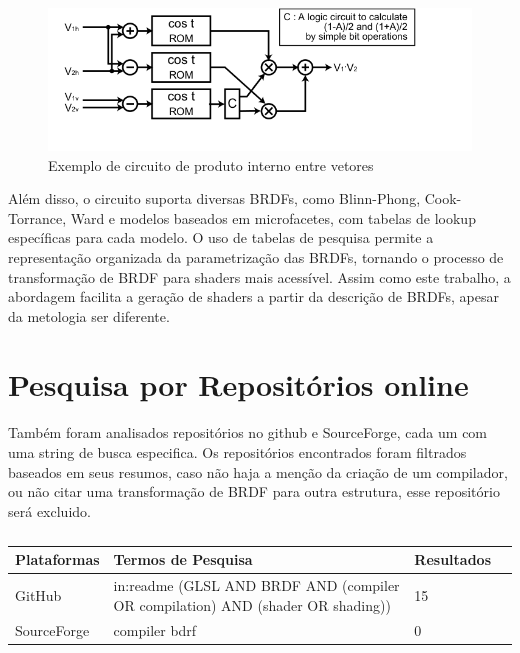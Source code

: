 \documentclass[english, 
               brazil, 
               bsc] %
               {dcomp-abntex2}
\begin{document}
\begin{figure}[H]
	\caption{\label{fig_grafico} Exemplo de circuito de produto interno entre vetores}
	\begin{center}
	    \includegraphics[scale=0.9]{./Imagens/rom-cos-lookup-table.png}
	\end{center}
\end{figure}


Além disso, o circuito suporta diversas BRDFs, como Blinn-Phong, Cook-Torrance, Ward e modelos baseados em microfacetes, com tabelas de lookup específicas para cada modelo. O uso de tabelas de pesquisa permite a representação organizada da parametrização das BRDFs, tornando o processo de transformação de BRDF para shaders mais acessível. Assim como este trabalho, a abordagem facilita a geração de shaders a partir da descrição de BRDFs, apesar da metologia ser diferente.

\section{Pesquisa por Repositórios online}
Também foram analisados repositórios no github e SourceForge, cada um com uma string de busca especifica. Os repositórios encontrados foram filtrados baseados em seus resumos, caso não haja a menção da criação de um compilador, ou não citar uma transformação de BRDF para outra estrutura, esse repositório será excluido.


\begin{table}[H]
\ABNTEXfontereduzida
\caption[bases]{}
\label{tab-bases}
\begin{tabular}{p{2.6cm}|p{6.0cm}|p{2.25cm}|p{3.40cm}}
   \textbf{Plataformas} & \textbf{Termos de Pesquisa}  & \textbf{Resultados}\\
   \hline
   GitHub
   &
   in:readme (GLSL AND BRDF AND  (compiler OR compilation) AND (shader OR shading))
   & 15
   \\ \hline
   SourceForge
   &
   compiler bdrf
   & 0
\end{tabular}
\end{table}
\end{document}
